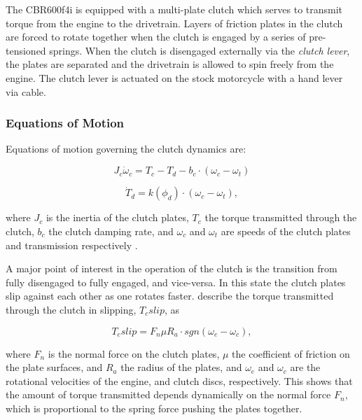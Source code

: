 The CBR600f4i is equipped with a multi-plate clutch which serves to transmit torque from the engine to the drivetrain. Layers of friction plates in the clutch are forced to rotate together when the clutch is engaged by a series of pre-tensioned springs. When the clutch is disengaged externally via the \emph{clutch lever}, the plates are separated and the drivetrain is allowed to spin freely from the engine. The clutch lever is actuated on the stock motorcycle with a hand lever via cable.

\subsubsection{Equations of Motion}

Equations of motion governing the clutch dynamics are:

\begin{equation}\label{eq:clutch_dynamics_a}
  J_c\dot{\omega}_c=T_c-T_d-b_c\cdot\left(\omega_c-\omega_t\right)
\end{equation}

\begin{equation}\label{eq:clutch_dynamics_b}
  \dot{T}_d=k\left(\phi_d\right)\cdot\left(\omega_c-\omega_t\right),
\end{equation}

where $J_c$ is the inertia of the clutch plates, $T_c$ the torque transmitted through the clutch, $b_c$ the clutch damping rate, and $\omega_c$ and $\omega_t$ are speeds of the clutch plates and transmission respectively \cite{clutch_control}.

A major point of interest in the operation of the clutch is the transition from fully disengaged to fully engaged, and vice-versa. In this state the clutch plates slip against each other as one rotates faster.  describe the torque transmitted through the clutch in slipping, $T_c{slip}$, as

\begin{equation}\label{eq:clutch_slip}
  T_c{slip}=F_n\mu R_a \cdot sgn\left(\omega_e-\omega_c\right),
\end{equation}

where $F_n$ is the normal force on the clutch plates, $\mu$ the coefficient of friction on the plate surfaces, and $R_a$ the radius of the plates, and $\omega_e$ and $\omega_c$ are the rotational velocities of the engine, and clutch discs, respectively. This shows that the amount of torque transmitted depends dynamically on the normal force $F_n$, which is proportional to the spring force pushing the plates together.

